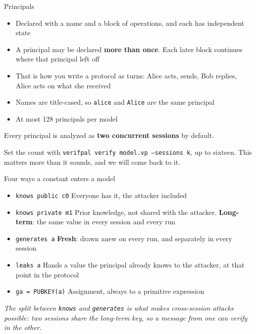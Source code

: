 \ifdefined\PRESENTATION\else\PassOptionsToClass{handout}{beamer}\fi\documentclass[aspectratio=169, lualatex]{beamer}
\begin{document}
\begin{frame}{Principals}
	\begin{itemize}
		\item Declared with a name and a block of operations, and each has independent state
		\item A principal may be declared \textbf{more than once}. Each later block continues where that principal left off
		\item That is how you write a protocol as turns: Alice acts, sends, Bob replies, Alice acts on what she received
		\item Names are title-cased, so \texttt{alice} and \texttt{Alice} are the same principal
		\item At most 128 principals per model
	\end{itemize}
	\vspace{0.5em}
	\begin{center}
		Every principal is analyzed as \textbf{two concurrent sessions} by default.

		\vspace{0.3em}

		\small Set the count with \texttt{verifpal verify model.vp --sessions k}, up to sixteen. This matters more than it sounds, and we will come back to it.
	\end{center}
\end{frame}

\begin{frame}{Four ways a constant enters a model}
	\begin{itemize}
		\item \texttt{knows public c0} \quad Everyone has it, the attacker included
		\item \texttt{knows private m1} \quad Prior knowledge, not shared with the attacker. \textbf{Long-term}: the same value in every session and every run
		\item \texttt{generates a} \quad \textbf{Fresh}: drawn anew on every run, and separately in every session
		\item \texttt{leaks a} \quad Hands a value the principal already knows to the attacker, at that point in the protocol
		\item \texttt{ga = PUBKEY(a)} \quad Assignment, always to a primitive expression
	\end{itemize}
	\vspace{0.3em}
	\begin{center}
		\small
		\textit{The split between \texttt{knows} and \texttt{generates} is what makes cross-session attacks possible: two sessions share the long-term key, so a message from one can verify in the other.}
	\end{center}
\end{frame}
\end{document}
